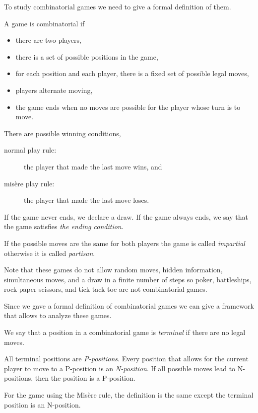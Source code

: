 To study combinatorial games we need to give a formal definition of them.
\begin{definition}
  A game is combinatorial if
  \begin{itemize}
    \item there are two players,
    \item there is a set of possible positions in the game,
    \item for each position and each player, there is a fixed set of possible
      legal moves,
    \item players alternate moving,
    \item the game ends when no moves are possible for the player whose
      turn is to move.
  \end{itemize}
  There are possible winning conditions,
  \begin{description}
    \item [normal play rule:] the player that made the last move wins, and
    \item [mis\`ere play rule:] the player that made the last move loses.
  \end{description}
  If the game never ends, we declare a draw. If the game always ends, we
  say that the game satisfies \emph{the ending condition}.

  If the possible moves are the same for both players the game is
  called \emph{impartial} otherwise it is called \emph{partisan}.
\end{definition}

Note that these games do not allow random moves, hidden information,
simultaneous moves, and a draw in a finite number of steps so
poker, battleships, rock-paper-scissors, and tick tack toe are not
combinatorial games.

Since we gave a formal definition of combinatorial games we can give a framework
that allows to analyze these games.
\begin{definition}
  We say that a position in a combinatorial game is \emph{terminal} if there
  are no legal moves.

  All terminal positions are \emph{P-positions}. Every position that allows for
  the current player to move to a P-position is an \emph{N-position}. If all
  possible moves lead to N-positions, then the position is a P-position.

  For the game using the Mis\`ere rule, the definition is the same except the
  terminal position is an N-position.
\end{definition}

